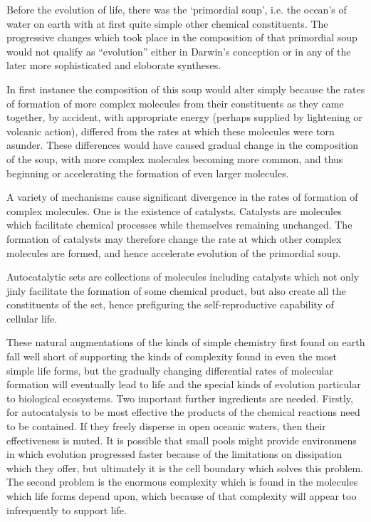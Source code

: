 {Before the evolution of life, there was the `primordial soup', i.e. the ocean's of water on earth with at first quite simple other chemical constituents.
The progressive changes which took place in the composition of that primordial soup would not qualify as ``evolution'' either in Darwin's conception or in any of the later more sophisticated and eloborate syntheses.

In first instance the composition of this soup would alter simply because the rates of formation of more complex molecules from their constituents as they came together, by accident, with appropriate energy (perhaps supplied by lightening or volcanic action), differed from the rates at which these molecules were torn asunder.
These differences would have caused gradual change in the composition of the soup, with more complex molecules becoming more common, and thus beginning or accelerating the formation of even larger molecules.

A variety of mechanisms cause significant divergence in the rates of formation of complex molecules.
One is the existence of catalysts.
Catalysts are molecules which facilitate chemical processes while themselves remaining unchanged.
The formation of catalysts may therefore change the rate at which other complex molecules are formed, and hence accelerate evolution of the primordial soup.

Autocatalytic sets are collections of molecules including catalysts which not only jinly facilitate the formation of some chemical product, but also create all the constituents of the set, hence prefiguring the self-reproductive capability of cellular life.

These natural augmentations of the kinds of simple chemistry first found on earth fall well short of supporting the kinds of complexity found in even the most simple life forms, but the gradually changing differential rates of molecular formation will eventually lead to life and the special kinds of evolution particular to biological ecosystems.
Two important further ingredients are needed.
Firstly, for autocatalysis to be most effective the products of the chemical reactions need to be contained.
If they freely disperse in open oceanic waters, then their effectiveness is muted.
It is possible that small pools might provide environmens in which evolution progressed faster because of the limitations on dissipation which they offer, but ultimately it is the cell boundary which solves this problem.
The second problem is the enormous complexity which is found in the molecules which life forms depend upon, which because of that complexity will appear too infrequently to support life.

}
